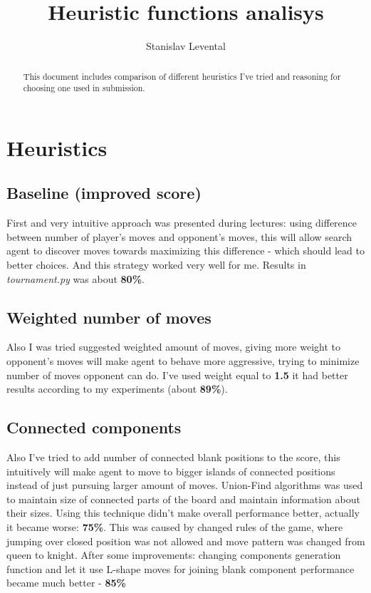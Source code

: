 \documentclass[11pt]{article}
\title{\LARGE \bf Heuristic functions analisys}
\author{Stanislav Levental}
\begin{document}
\maketitle

\begin{abstract}

This document includes comparison of different heuristics I've tried and reasoning for choosing one used in submission.

\end{abstract}

\section{Heuristics}

\subsection{Baseline (improved score)}
First and very intuitive approach was presented during lectures: using difference between number of player's moves and opponent's moves, this will allow search agent to discover moves towards maximizing this difference - which should lead to better choices. And this strategy worked very well for me. Results in \textit{tournament.py} was about \textbf{80\%}.

\subsection{Weighted number of moves}
Also I was tried suggested weighted amount of moves, giving more weight to opponent's moves will make agent to behave more aggressive, trying to minimize number of moves opponent can do. I've used weight equal to \textbf{1.5} it had better results according to my experiments (about \textbf{89\%}).

\subsection{Connected components}
Also I've tried to add number of connected blank positions to the score, this intuitively will make agent to move to bigger islands of connected positions instead of just pursuing larger amount of moves. Union-Find algorithms was used to maintain size of connected parts of the board and maintain information about their sizes. Using this technique didn't make overall performance better, actually it became worse: \textbf{75\%}. This was caused by changed rules of the game, where jumping over closed position was not allowed and move pattern was changed from queen to knight. After some improvements: changing components generation function and let it use L-shape moves for joining blank component performance became much better - \textbf{85\%}
\end{document}
